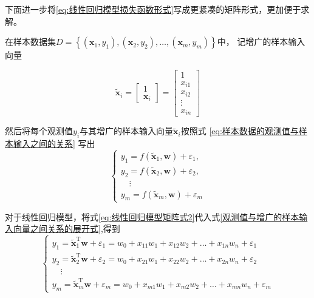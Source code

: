 \documentclass[withoutpreface,bwprint]{NoteBook}
\begin{document}
下面进一步将\cref{eq:线性回归模型损失函数形式}写成更紧凑的矩阵形式，更加便于求解。

在样本数据集$D=\left\{ (\mathbf{x}_1,y_1), (\mathbf{x}_2,y_2),\dots, (\mathbf{x}_m,y_m) \right\}$中，
记增广的样本输入向量

$$
\tilde{\mathbf{x}}_i
= 
\begin{bmatrix} 
    1 \\
    \mathbf{x}_i
\end{bmatrix}
= 
\begin{bmatrix} 
    1 \\
    x_{i1} \\
    x_{i2}\\
    \vdots \\
    x_{in}
\end{bmatrix}
$$

然后将每个观测值$y_i$与其增广的样本输入向量$\tilde{\mathbf{x}}_i$按照式 \cref{eq:样本数据的观测值与样本输入之间的关系} 写出
\begin{equation}
\label{观测值与增广的样本输入向量之间关系的展开式}
\begin{cases}
    y_1 = f(\tilde{\mathbf{x}}_1,\mathbf{w})+\varepsilon_1, \\
    y_2 = f(\tilde{\mathbf{x}}_2,\mathbf{w})+\varepsilon_2, \\
    \quad   \vdots \\
    y_m = f(\tilde{\mathbf{x}}_m,\mathbf{w})+\varepsilon_m
\end{cases}
\end{equation}

对于线性回归模型，将式\cref{eq:线性回归模型矩阵式2}代入式\cref{观测值与增广的样本输入向量之间关系的展开式},得到
\begin{equation}
    \label{观测值与增广的样本输入向量之间线性关系的展开式}
    \begin{cases}
        y_1 = \tilde{\mathbf{x}}_1^\mathrm{T}\mathbf{w} +\varepsilon_1 = w_0 + x_{11}w_1 + x_{12}w_2 + \dots + x_{1n}w_n + \varepsilon_1 \\
        y_2 = \tilde{\mathbf{x}}_2^\mathrm{T}\mathbf{w} +\varepsilon_2 = w_0 + x_{21}w_1 + x_{22}w_2 + \dots + x_{2n}w_n + \varepsilon_2 \\
        \quad    \vdots \\
        y_m = \tilde{\mathbf{x}}_m^\mathrm{T}\mathbf{w} +\varepsilon_m = w_0 + x_{m1}w_1 + x_{m2}w_2 + \dots + x_{mn}w_n + \varepsilon_m 
    \end{cases}
\end{equation}
\end{document}
